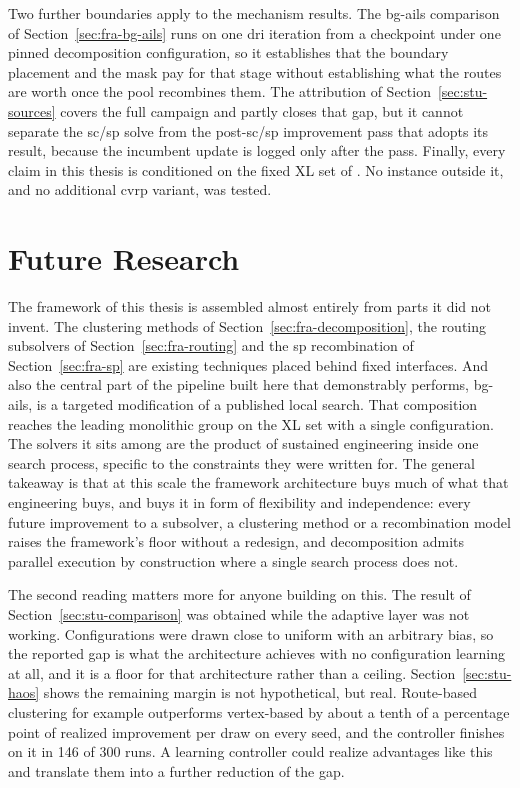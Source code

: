 Two further boundaries apply to the mechanism results. The \gls{bg-ails} comparison
of Section~\ref{sec:fra-bg-ails} runs on one \gls{dri} iteration from a checkpoint under
one pinned decomposition configuration, so it establishes that the boundary placement and the mask
pay for that stage without establishing what the routes are worth once the pool
recombines them. The attribution of Section~\ref{sec:stu-sources} covers the full campaign and partly closes
that gap, but it cannot separate the \gls{sc}/\gls{sp} solve from the post-\gls{sc}/\gls{sp} improvement pass
that adopts its result, because the incumbent update is logged only after the
pass. Finally, every claim in this thesis is conditioned on the fixed XL set of
\citet{queirogaXLInstancesCapacitated2026}. No instance outside it, and no additional \gls{cvrp} variant, was tested.

\section{Future Research}
\label{sec:con-future}
The framework of this thesis is assembled almost entirely from parts it did not
invent.  The clustering methods of Section~\ref{sec:fra-decomposition}, the
routing subsolvers of Section~\ref{sec:fra-routing} and the \gls{sp}
recombination of Section~\ref{sec:fra-sp} are existing techniques
placed behind fixed interfaces. And also the central part of the pipeline built here that
demonstrably performs, \gls{bg-ails}, is a targeted modification of a published local
search.  That composition reaches the leading monolithic group on the XL set
with a single configuration.  The solvers it sits among are the product of
sustained engineering inside one search process, specific to the constraints
they were written for.  The general takeaway is that at this scale the
framework architecture buys much of what that engineering buys, and buys it in form of flexibility and independence: every future improvement to a subsolver, a clustering method or a
recombination model raises the framework's floor without a redesign, and
decomposition admits parallel execution by construction where a single search
process does not.

The second reading matters more for anyone building on this.  The result of
Section~\ref{sec:stu-comparison} was obtained while the adaptive layer was
not working.  Configurations were drawn close to uniform with an arbitrary bias,
so the reported gap is what the architecture achieves with no configuration
learning at all, and it is a floor for that architecture rather than a ceiling.
Section~\ref{sec:stu-haos} shows the remaining margin is not hypothetical, but real.
Route-based clustering for example outperforms vertex-based by about a tenth of a percentage
point of realized improvement per draw on every seed, and the controller
finishes on it in 146 of 300 runs.  A learning controller could realize advantages like this and translate them into a further reduction of the gap.

